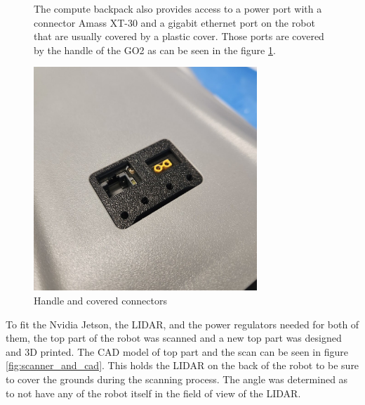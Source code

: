 \documentclass[11pt]{article}
\begin{document}
        \begin{figure}[H]
            \centering
            \begin{minipage}{0.45\textwidth}
                The compute backpack also provides access to a power port with a connector Amass XT-30 and a gigabit ethernet port on the robot that are usually covered by a plastic cover. Those ports are covered by the handle of the GO2 as can be seen in the figure \ref{fig:handle_cover}.
            \end{minipage}%
            \hfill
            \begin{minipage}{0.5\textwidth}
                \centering
                \includegraphics[width=0.75\textwidth]{Images/PortsWithCover.jpg}
                \caption{Handle and covered connectors}
                \label{fig:handle_cover}
            \end{minipage}
        \end{figure}
        To fit the Nvidia Jetson, the LIDAR, and the power regulators needed for both of them, the top part of the robot was scanned and a new top part was designed and 3D printed. The CAD model of top part and the scan can be seen in figure \ref{fig:scanner_and_cad}. This holds the LIDAR on the back of the robot to be sure to cover the grounds during the scanning process. The angle was determined as to not have any of the robot itself in the field of view of the LIDAR.
\end{document}
